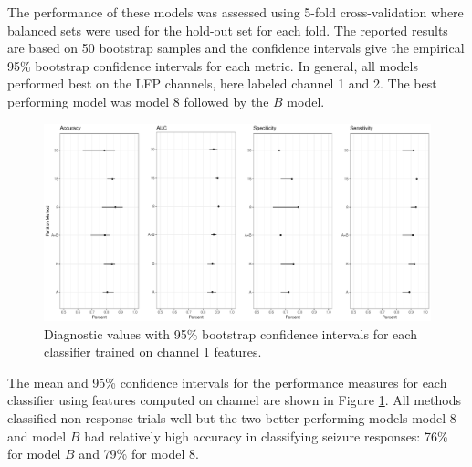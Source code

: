 The performance of these models was assessed using 
5-fold cross-validation where balanced sets were used for the hold-out set for each fold. The reported results are based on 50 bootstrap samples and the confidence intervals give the empirical 95\% bootstrap 
confidence intervals for each metric.
In general, all models performed best on the LFP channels, 
here labeled channel 1 and 2. The best performing model was model $8$ followed by the $B$ model.

\begin{figure}[!htbp]
  \begin{center}
  \includegraphics[width = \textwidth, keepaspectratio]{./figs/eeg-partition-diagnostic.pdf}
  \end{center}
  \caption{Diagnostic values with 95\% bootstrap confidence intervals for each classifier trained on channel 1 features.}
  \label{fig:eeg-diagnostic} 
\end{figure}

The mean and 95\% confidence intervals for the 
performance measures for each classifier using features
computed on channel are shown in Figure \ref{fig:eeg-diagnostic}.
All methods classified non-response trials well but the two better performing
 models \textemdash model 8  and model $B$ \textemdash 
had relatively high accuracy in classifying seizure responses: 76\% for model $B$ and 79\% for model 8. 

